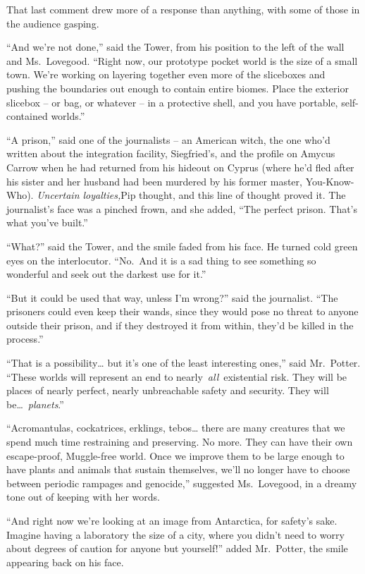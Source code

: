 That last comment drew more of a response than anything, with some of
those in the audience gasping.

``And we're not done,'' said the Tower, from his position to the left of
the wall and Ms.~Lovegood. ``Right now, our prototype pocket world is
the size of a small town. We're working on layering together even more
of the sliceboxes and pushing the boundaries out enough to contain
entire biomes. Place the exterior slicebox -- or bag, or whatever -- in
a protective shell, and you have portable, self-contained worlds.''

``A prison,'' said one of the journalists -- an American witch, the one
who'd written about the integration facility, Siegfried's, and the
profile on Amycus Carrow when he had returned from his hideout on Cyprus
(where he'd fled after his sister and her husband had been murdered by
his former master, You-Know-Who). \emph{Uncertain loyalties,}Pip
thought, and this line of thought proved it. The journalist's face was a
pinched frown, and she added, ``The perfect prison. That's what you've
built.''

``What?'' said the Tower, and the smile faded from his face. He turned
cold green eyes on the interlocutor. ``No.~And it is a sad thing to see
something so wonderful and seek out the darkest use for it.''

``But it could be used that way, unless I'm wrong?'' said the
journalist. ``The prisoners could even keep their wands, since they
would pose no threat to anyone outside their prison, and if they
destroyed it from within, they'd be killed in the process.''

``That is a possibility\ldots{} but it's one of the least interesting
ones,'' said Mr.~Potter. ``These worlds will represent an end to
nearly~\emph{all}~existential risk. They will be places of nearly
perfect, nearly unbreachable safety and security. They will
be\ldots~\emph{planets}.''

``Acromantulas, cockatrices, erklings, tebos\ldots{} there are many
creatures that we spend much time restraining and preserving. No more.
They can have their own escape-proof, Muggle-free world. Once we improve
them to be large enough to have plants and animals that sustain
themselves, we'll no longer have to choose between periodic rampages and
genocide,'' suggested Ms.~Lovegood, in a dreamy tone out of keeping with
her words.

``And right now we're looking at an image from Antarctica, for safety's
sake. Imagine having a laboratory the size of a city, where you didn't
need to worry about degrees of caution for anyone but yourself!'' added
Mr.~Potter, the smile appearing back on his face.


